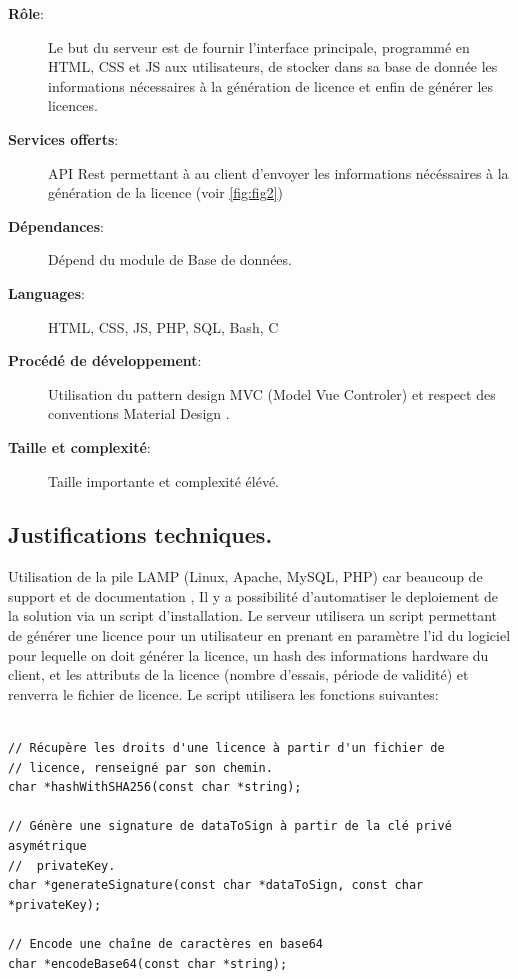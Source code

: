 \begin{description}
	\item[\textbf{Rôle}:]
				Le but du serveur est de fournir l'interface principale, programmé 
				en HTML, CSS et JS aux utilisateurs, de stocker dans sa base de donnée
				les informations nécessaires à la génération de licence et enfin de générer 
				les licences.
	\item[\textbf{Services offerts}:]
				API Rest \cite{REST} permettant à au client d'envoyer les informations
				nécéssaires à la génération de la licence (voir \ref{fig:fig2})				
	\item[\textbf{Dépendances}:]
				Dépend du module de Base de données.
	\item[\textbf{Languages}:]
				HTML, CSS, JS, PHP, SQL, Bash, C 
	\item[\textbf{Procédé de développement}:]
				Utilisation du pattern design MVC (Model Vue Controler) et respect des
                conventions Material Design \cite{Material}.

	\item[\textbf{Taille et complexité}:]
				Taille importante et complexité élévé.
\end{description}

\subsection{Justifications techniques.}
Utilisation de la pile LAMP (Linux, Apache, MySQL, PHP) car beaucoup de 
support et de documentation \cite{LAMP}, Il y a possibilité d'automatiser 
le deploiement de la solution via un script d'installation. \newline
Le serveur utilisera un script permettant de générer une licence pour un 
utilisateur en prenant en paramètre l'id du logiciel pour lequelle on doit 
générer la licence, un hash des informations hardware du client, et les
attributs de la licence (nombre d'essais, période de validité) et renverra
le fichier de licence. Le script utilisera les fonctions suivantes:
\begin{verbatim}

// Récupère les droits d'une licence à partir d'un fichier de
// licence, renseigné par son chemin.
char *hashWithSHA256(const char *string);

// Génère une signature de dataToSign à partir de la clé privé asymétrique 
//  privateKey. 
char *generateSignature(const char *dataToSign, const char *privateKey);
  
// Encode une chaîne de caractères en base64
char *encodeBase64(const char *string);

\end{verbatim}

